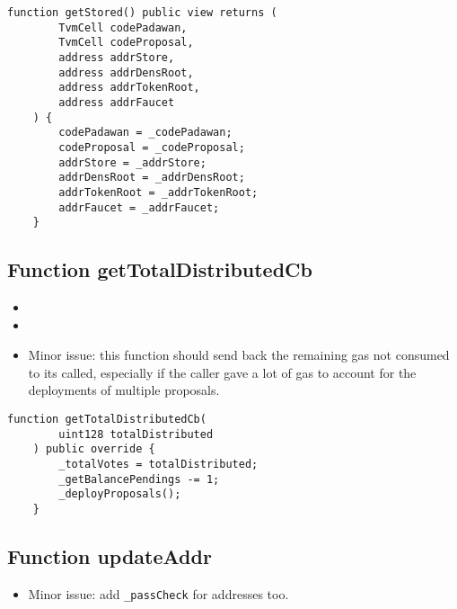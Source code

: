 \begin{lstlisting}[firstnumber=198]
    function getStored() public view returns (
        TvmCell codePadawan,
        TvmCell codeProposal,
        address addrStore,
        address addrDensRoot,
        address addrTokenRoot,
        address addrFaucet
    ) {
        codePadawan = _codePadawan;
        codeProposal = _codeProposal;
        addrStore = _addrStore;
        addrDensRoot = _addrDensRoot;
        addrTokenRoot = _addrTokenRoot;
        addrFaucet = _addrFaucet;
    }
\end{lstlisting}

\subsection{Function getTotalDistributedCb}

\begin{itemize}
\item {}
\item {}
\item Minor issue: this function should send back the remaining gas
  not consumed to its called, especially if the caller gave a lot of
  gas to account for the deployments of multiple proposals.
\end{itemize}

\begin{lstlisting}[firstnumber=148]
    function getTotalDistributedCb(
        uint128 totalDistributed
    ) public override {
        _totalVotes = totalDistributed;
        _getBalancePendings -= 1;
        _deployProposals();
    }
\end{lstlisting}

\subsection{Function updateAddr}

\begin{itemize}
\item Minor issue: add {\tt \_passCheck} for addresses too.
\end{itemize}


